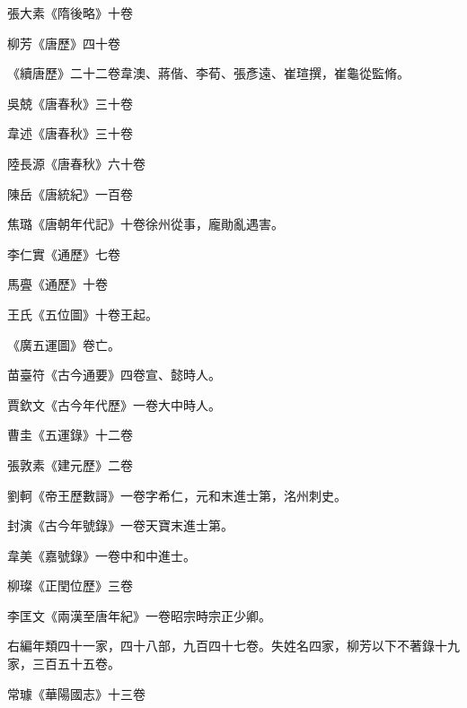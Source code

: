\begin{pinyinscope}
 張大素《隋後略》十卷



 柳芳《唐歷》四十卷



 《續唐歷》二十二卷韋澳、蔣偕、李荀、張彥遠、崔瑄撰，崔龜從監脩。



 吳兢《唐春秋》三十卷



 韋述《唐春秋》三十卷



 陸長源《唐春秋》六十卷



 陳岳《唐統紀》一百卷



 焦璐《唐朝年代記》十卷徐州從事，龐勛亂遇害。



 李仁實《通歷》七卷



 馬亹《通歷》十卷



 王氏《五位圖》十卷王起。



 《廣五運圖》卷亡。



 苗臺符《古今通要》四卷宣、懿時人。



 賈欽文《古今年代歷》一卷大中時人。



 曹圭《五運錄》十二卷



 張敦素《建元歷》二卷



 劉軻《帝王歷數謌》一卷字希仁，元和末進士第，洺州刺史。



 封演《古今年號錄》一卷天寶末進士第。



 韋美《嘉號錄》一卷中和中進士。



 柳璨《正閏位歷》三卷



 李匡文《兩漢至唐年紀》一卷昭宗時宗正少卿。



 右編年類四十一家，四十八部，九百四十七卷。失姓名四家，柳芳以下不著錄十九家，三百五十五卷。



 常璩《華陽國志》十三卷




\end{pinyinscope}
